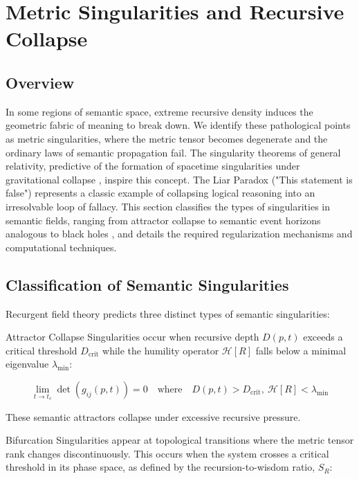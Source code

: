 \chapter{Metric Singularities and Recursive Collapse}

\section{Overview}

In some regions of semantic space, extreme recursive density induces the geometric fabric of meaning to break down. We identify these pathological points as metric singularities, where the metric tensor becomes degenerate and the ordinary laws of semantic propagation fail. The singularity theorems of general relativity, predictive of the formation of spacetime singularities under gravitational collapse \autocite{Penrose1965}, inspire this concept. The Liar Paradox ("This statement is false") represents a classic example of collapsing logical reasoning into an irresolvable loop of fallacy. This section classifies the types of singularities in semantic fields, ranging from attractor collapse to semantic event horizons analogous to black holes \autocite{Hawking1974}, and details the required regularization mechanisms and computational techniques.

\section{Classification of Semantic Singularities}

Recurgent field theory predicts three distinct types of semantic singularities:

Attractor Collapse Singularities occur when recursive depth \(D(p, t)\) exceeds a critical threshold \(D_{\text{crit}}\) while the humility operator \(\mathcal{H}[R]\) falls below a minimal eigenvalue \(\lambda_{\text{min}}\):

\begin{equation}
\lim_{t \to t_c} \det(g_{ij}(p, t)) = 0 \quad \text{where} \quad D(p, t) > D_{\text{crit}},\ \mathcal{H}[R] < \lambda_{\text{min}}
\end{equation}

These semantic attractors collapse under excessive recursive pressure.

Bifurcation Singularities appear at topological transitions where the metric tensor rank changes discontinuously. This occurs when the system crosses a critical threshold in its phase space, as defined by the recursion-to-wisdom ratio, \(S_R\):

